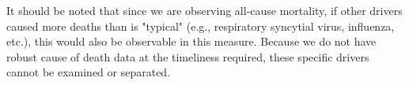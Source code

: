 \documentclass[
10pt, %
a4paper, %
oneside, %
DIV=16,
parskip=full,
headinclude,footinclude %
]{scrartcl}
\begin{document}
It should be noted that since we are observing all-cause mortality, if other drivers caused more deaths than is "typical" (e.g., respiratory syncytial virus, influenza, etc.), this would also be observable in this measure. Because we do not have robust cause of death data at the timeliness required, these specific drivers cannot be examined or separated.



\renewcommand{\refname}{\spacedlowsmallcaps{References}} %




\end{document}
